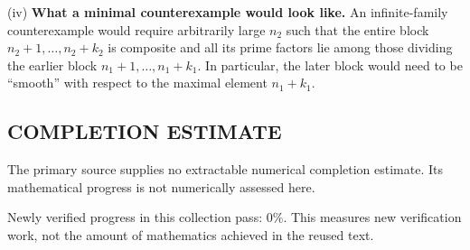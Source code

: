 (iv) \textbf{What a minimal counterexample would look like.}
An infinite-family counterexample would require arbitrarily large $n_2$ such that the entire block $n_2+1,\dots,n_2+k_2$ is composite and all its prime factors lie among those dividing the earlier block $n_1+1,\dots,n_1+k_1$. In particular, the later block would need to be ``smooth'' with respect to the maximal element $n_1+k_1$.




\subsection*{COMPLETION ESTIMATE}
The primary source supplies no extractable numerical completion estimate. Its mathematical progress is not numerically assessed here.

Newly verified progress in this collection pass: $0\%$. This measures new verification work, not the amount of mathematics achieved in the reused text.
